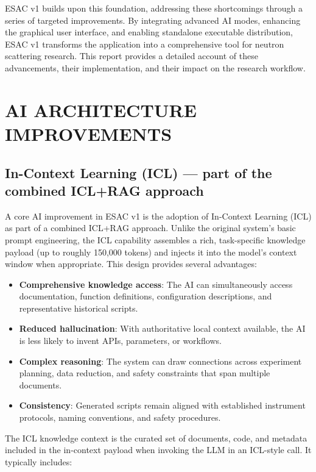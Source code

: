 \documentclass[tm]{ornltm} %
\begin{document}
ESAC v1 builds upon this foundation, addressing these shortcomings through a series of targeted improvements. By integrating advanced AI modes, enhancing the graphical user interface, and enabling standalone executable distribution, ESAC v1 transforms the application into a comprehensive tool for neutron scattering research. This report provides a detailed account of these advancements, their implementation, and their impact on the research workflow.

\section{AI ARCHITECTURE IMPROVEMENTS}
\label{sec:ai_improvements}

\subsection{In-Context Learning (ICL) — part of the combined ICL+RAG approach}
\label{subsec:icl_mode}

A core AI improvement in ESAC v1 is the adoption of In-Context Learning (ICL) as part of a combined ICL+RAG approach. Unlike the original system's basic prompt engineering, the ICL capability assembles a rich, task-specific knowledge payload (up to roughly 150{,}000 tokens) and injects it into the model's context window when appropriate. This design provides several advantages:

\begin{itemize}
  \item \textbf{Comprehensive knowledge access}: The AI can simultaneously access documentation, function definitions, configuration descriptions, and representative historical scripts.
  \item \textbf{Reduced hallucination}: With authoritative local context available, the AI is less likely to invent APIs, parameters, or workflows.
  \item \textbf{Complex reasoning}: The system can draw connections across experiment planning, data reduction, and safety constraints that span multiple documents.
  \item \textbf{Consistency}: Generated scripts remain aligned with established instrument protocols, naming conventions, and safety procedures.
\end{itemize}

The ICL knowledge context is the curated set of documents, code, and metadata included in the in-context payload when invoking the LLM in an ICL-style call. It typically includes:
\end{document}
